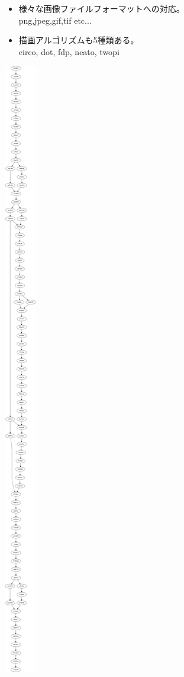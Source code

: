 \documentclass[cjk,dvipdfmx,20pt]{beamer}
\begin{document}
\begin{frame}{}
\begin{itemize}
 \item 様々な画像ファイルフォーマットへの対応。\\
    png,jpeg,gif,tif etc...
 \item 描画アルゴリズムも5種類ある。\\
    circo, dot, fdp, neato, twopi

\end{itemize}
\end{frame}

\begin{frame}{}
\begin{center}
\includegraphics[width=0.2\hsize]{image200812/git-dot.png}

\end{center}
\end{frame}
\end{document}
